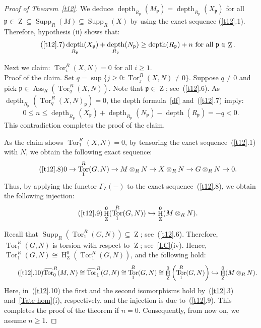 \documentclass[11pt]{amsart}
\theoremstyle{definition}
\theoremstyle{definition}
\numberwithin{equation}{section}
\newcommand{\fp}{\mathfrak{p}}
\DeclareMathOperator{\Ass}{Ass}
\DeclareMathOperator{\mz}{Z}
\DeclareMathOperator{\depth}{depth}
\DeclareMathOperator{\hh}{H}
\DeclareMathOperator{\Supp}{Supp}
\DeclareMathOperator{\Tor}{Tor}
\begin{document}
\begin{proof}[Proof of Theorem~\ref{t12}]
We deduce $\depth_{R_{\fp}}(M_\fp)=\depth_{R_{\fp}}(X_\fp)$ for all $\fp\in\mz\subseteq\Supp_R(M)\subseteq\Supp_R(X)$ by using the exact sequence (\ref{t12}.1). Therefore, hypothesis (ii) shows that:		
\begin{equation} \label{t127}\tag{\ref*{t12}.7}
\depth_{R_{\fp}}(X_\fp)+\depth_{R_{\fp}}(N_\fp)\geq\depth(R_{\fp})+ n \text{ for all } \fp\in\mz.
\end{equation}

Next we claim: $\Tor_i^R(X,N)=0$ for all $i\geq 1$.\\
Proof of the claim. Set $q=\sup\{j\geq 0: \Tor_{j}^R(X,N)\neq0\}$. Suppose $q\neq 0$ and pick $\fp\in\Ass_R(\Tor_q^R(X,N))$. Note that $\fp \in \mz$; see~(\ref{t12}.6). As $\depth_{R_\fp}(\Tor_q^R(X,N)_\fp)=0$, the depth formula~\ref{df} and~(\ref{t12}.7) imply:
$$0\leq n\leq \depth_{R_\fp}(X_\fp)+\depth_{R_\fp}(N_\fp)-\depth(R_\fp)=-q<0.$$
This contradiction completes the proof of the claim. 

As the claim shows $\Tor_1^R(X,N)=0$, by tensoring the exact sequence~(\ref{t12}.1) with $N$, we obtain the following exact sequence:
\begin{equation}\label{t128}\tag{\ref*{t12}.8}
0\rightarrow\Tor_1^R(G,N)\rightarrow M\otimes_RN\rightarrow X\otimes_RN\rightarrow G\otimes_RN\rightarrow0.
 \end{equation}
 Thus, by applying the functor $\Gamma_{\mz}(-)$ to the exact sequence~(\ref{t12}.8), we obtain the following injection:
 \begin{equation} \label{t129}\tag{\ref*{t12}.9}
 \hh^0_{\mz}(\Tor_1^R(G,N))\hookrightarrow\hh^0_{\mz}(M\otimes_RN).
\end{equation}

Recall that $\Supp_R\left(\Tor_1^R(G,N)\right)\subseteq\mz$; see~(\ref{t12}.6). Therefore, $\Tor_1^R(G,N)$ is torsion with respect to $\mz$; see~\ref{LC}(iv). Hence, $\Tor_{1}^R(G,N)\cong\hh^0_{\mz}(\Tor_1^R(G,N))$, and the following hold: 
\begin{equation}\label{t1210}\tag{\ref*{t12}.10}
\widehat{\Tor}_0^R(M,N)\cong\widehat{\Tor}_1^R(G,N)\cong\Tor_{1}^R(G,N)\cong\hh^0_{\mz}\left(\Tor_1^R(G,N)\right)\hookrightarrow\hh^0_{\mz}(M\otimes_RN).
\end{equation}
Here, in~(\ref{t12}.10) the first and the second isomorphisms hold by~(\ref{t12}.3) and~\ref{Tate hom}(i), respectively, and the injection is due to~(\ref{t12}.9). This completes the proof of the theorem if $n=0$. Consequently, from now on, we assume $n\geq 1$.


\end{proof}
\end{document}
